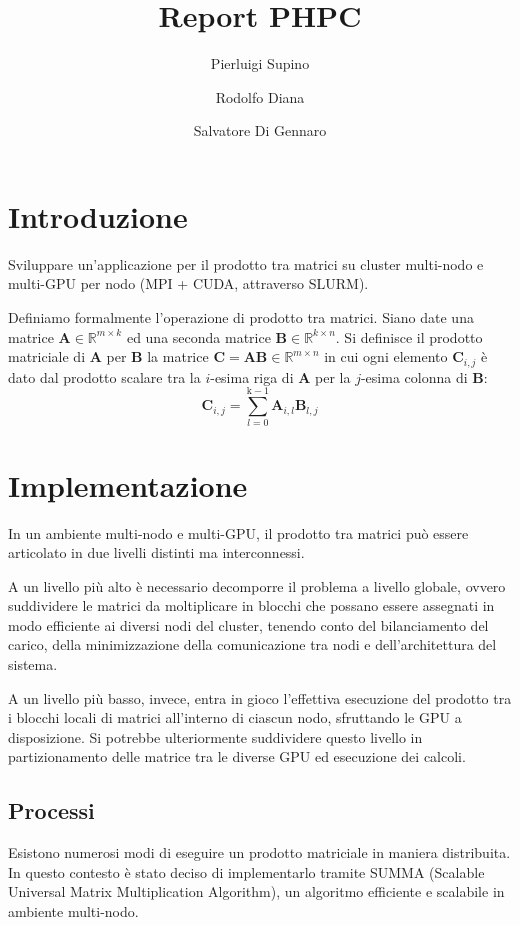 \documentclass[a4paper]{article}
\title{Report PHPC}
\author{Pierluigi Supino \and Rodolfo Diana \and Salvatore Di Gennaro}
\begin{document}
\maketitle
\tableofcontents

\section{Introduzione}

Sviluppare un’applicazione per il prodotto tra matrici su cluster multi-nodo e multi-GPU per nodo (MPI + CUDA, attraverso SLURM).

Definiamo formalmente l'operazione di prodotto tra matrici.
Siano date una matrice $\mathbf{A} \in \mathbb{R}^{m\times{k}}$ ed una seconda matrice $\mathbf{B} \in \mathbb{R}^{k\times{n}}$.
Si definisce il prodotto matriciale di $\mathbf{A}$ per $\mathbf{B}$ la matrice $\mathbf{C}=\mathbf{A}\mathbf{B} \in \mathbb{R}^{m\times{n}}$ in cui ogni elemento $\mathbf{C}_{i,j}$ è dato dal prodotto scalare tra la $i$-esima riga di $\mathbf{A}$ per la $j$-esima colonna di $\mathbf{B}$:
$$ \mathbf{C}_{i,j} = \sum_{l=0}^{\text{k}-1} \mathbf{A}_{i, l} \mathbf{B}_{l, j} $$

\section{Implementazione}
In un ambiente multi-nodo e multi-GPU, il prodotto tra matrici può essere articolato in due livelli distinti ma interconnessi.

A un livello più alto è necessario decomporre il problema a livello globale, ovvero suddividere le matrici da moltiplicare in blocchi che possano essere assegnati in modo efficiente ai diversi nodi del cluster, tenendo conto del bilanciamento del carico, della minimizzazione della comunicazione tra nodi e dell'architettura del sistema.

A un livello più basso, invece, entra in gioco l’effettiva esecuzione del prodotto tra i blocchi locali di matrici all’interno di ciascun nodo, sfruttando le GPU a disposizione. Si potrebbe ulteriormente suddividere questo livello in partizionamento delle matrice tra le diverse GPU ed esecuzione dei calcoli.

\subsection{Processi}
Esistono numerosi modi di eseguire un prodotto matriciale in maniera distribuita. In questo contesto è stato deciso di implementarlo tramite SUMMA (Scalable Universal Matrix Multiplication Algorithm), un algoritmo efficiente e scalabile in ambiente multi-nodo\cite{SUMMA}.
\end{document}
